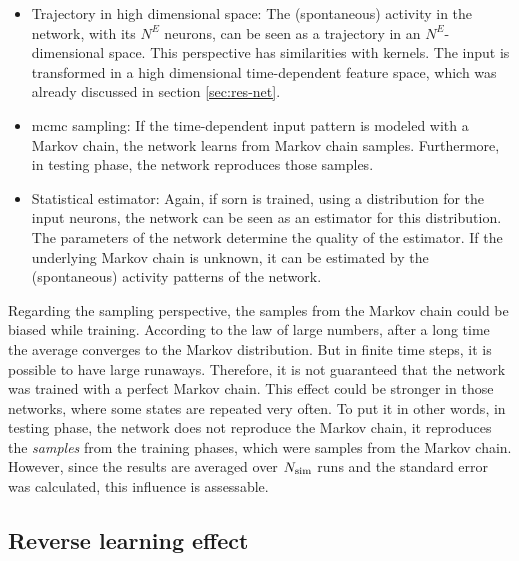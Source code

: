 \begin{itemize}
\item Trajectory in high dimensional space: The (spontaneous) activity in the network, with its $N^E$ neurons, can be seen as a trajectory in an $N^E$-dimensional space. This perspective has similarities with kernels. The input is transformed in a high dimensional time-dependent feature space, which was already discussed in section \ref{sec:res-net}.
\item \acl{mcmc} sampling: If the time-dependent input pattern is modeled with a Markov chain, the network learns from Markov chain samples. Furthermore, in testing phase, the network reproduces those samples.
\item Statistical estimator: Again, if \acs{sorn} is trained, using a distribution for the input neurons, the network can be seen as an estimator for this distribution. The parameters of the network determine the quality of the estimator. If the underlying Markov chain is unknown, it can be estimated by the (spontaneous) activity patterns of the network.
\end{itemize}

Regarding the sampling perspective, the samples from the Markov chain could be biased while training. According to the law of large numbers, after a long time the average converges to the Markov distribution. But in finite time steps, it is possible to have large runaways. Therefore, it is not guaranteed that the network was trained with a perfect Markov chain. This effect could be stronger in those networks, where some states are repeated very often. To put it in other words, in testing phase, the network does not reproduce the Markov chain, it reproduces the \emph{samples} from the training phases, which were samples from the Markov chain. However, since the results are averaged over $N_{\text{sim}}$ runs and the standard error was calculated, this influence is assessable.

\subsection{Reverse learning effect}

